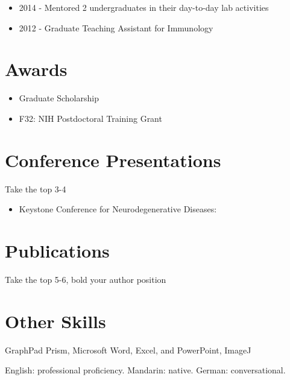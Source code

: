 \documentclass{article}
\begin{document}
	\begin{itemize}
		\item 2014 - Mentored 2 undergraduates in their day-to-day lab activities
		\item 2012 - Graduate Teaching Assistant for Immunology
	\end{itemize}


\section{Awards}

	\begin{itemize}
		\item Graduate Scholarship 
		\item F32: NIH Postdoctoral Training Grant
	\end{itemize}


\section{Conference Presentations }
	
	Take the top 3-4
	\begin{itemize}
		\item Keystone Conference for Neurodegenerative Diseases:
	\end{itemize}

 
\section{Publications}
	
	Take the top 5-6, bold your author position 


\section{Other Skills}
	
	\begin{description}[widest=Langauges]
		\item[Software]	GraphPad Prism, Microsoft Word, Excel, and PowerPoint, ImageJ
		\item[Languages]	English: professional proficiency.  Mandarin: native.  German: conversational.
	\end{description}


\end{document}
